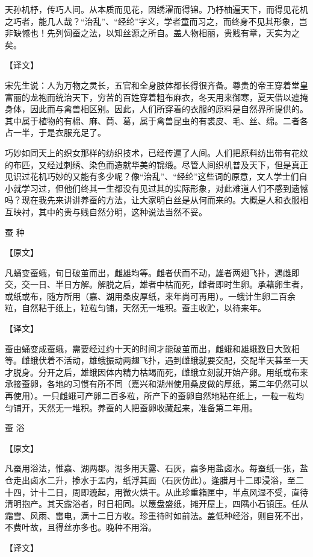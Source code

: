 \documentclass[12pt,UTF8]{ctexbook}
\begin{document}
天孙机杼，传巧人间。从本质而见花，因绣濯而得锦。乃杼柚遍天下，而得见花机之巧者，能几人哉？“治乱”、“经纶”字义，学者童而习之，而终身不见其形象，岂非缺憾也！先列饲蚕之法，以知丝源之所自。盖人物相丽，贵贱有章，天实为之矣。

【译文】

宋先生说：人为万物之灵长，五官和全身肢体都长得很齐备。尊贵的帝王穿着堂皇富丽的龙袍而统治天下，穷苦的百姓穿着粗布麻衣，冬天用来御寒，夏天借以遮掩身体，因此而与禽兽相区别。因此，人们所穿着的衣服的原料是自然界所提供的。其中属于植物的有棉、麻、茼、葛，属于禽兽昆虫的有裘皮、毛、丝、绵。二者各占一半，于是衣服充足了。

巧妙如同天上的织女那样的纺织技术，已经传遍了人间。人们把原料纺出带有花纹的布匹，又经过刺绣、染色而造就华美的锦缎。尽管人间织机普及天下，但是真正见识过花机巧妙的又能有多少呢？像“治乱”、“经纶”这些词的原意，文人学士们自小就学习过，但他们终其一生都没有见过其的实际形象，对此难道人们不感到遗憾吗？现在我先来讲讲养蚕的方法，让大家明白丝是从何而来的。大概是人和衣服相互映衬，其中的贵与贱自然分明，这种说法当然不妥。

蚕 种

【原文】

凡蛹变蚕蛾，旬日破茧而出，雌雄均等。雌者伏而不动，雄者两翅飞扑，遇雌即交，交一日、半日方解。解脱之后，雄者中枯而死，雌者即时生卵。承藉卵生者，或纸或布，随方所用（嘉、湖用桑皮厚纸，来年尚可再用）。一蛾计生卵二百余粒，自然粘于纸上，粒粒匀铺，天然无一堆积。蚕主收贮，以待来年。

【译文】

蚕由蛹变成蚕蛾，需要经过约十天的时间才能破茧而出，雌蛾和雄蛾数目大致相等。雌蛾伏着不活动，雄蛾振动两翅飞扑，遇到雌蛾就要交配，交配半天甚至一天才脱身。分开之后，雄蛾因体内精力枯竭而死，雌蛾立刻就开始产卵。用纸或布来承接蚕卵，各地的习惯有所不同（嘉兴和湖州使用桑皮做的厚纸，第二年仍然可以再使用）。一只雌蛾可产卵二百多粒，所产下的蚕卵自然地粘在纸上，一粒一粒均匀铺开，天然无一堆积。养蚕的人把蚕卵收藏起来，准备第二年用。

蚕 浴

【原文】

凡蚕用浴法，惟嘉、湖两郡。湖多用天露、石灰，嘉多用盐卤水。每蚕纸一张，盐仓走出卤水二升，掺水于盂内，纸浮其面（石灰仿此）。逢腊月十二即浸浴，至二十四，计十二日，周即漉起，用微火烘干。从此珍重箱匣中，半点风湿不受，直待清明抱产。其天露浴者，时日相同。以篾盘盛纸，摊开屋上，四隅小石镇压。任从霜雪、风雨、雷电，满十二日方收。珍重待时如前法。盖低种经浴，则自死不出，不费叶故，且得丝亦多也。晚种不用浴。

【译文】
\end{document}
